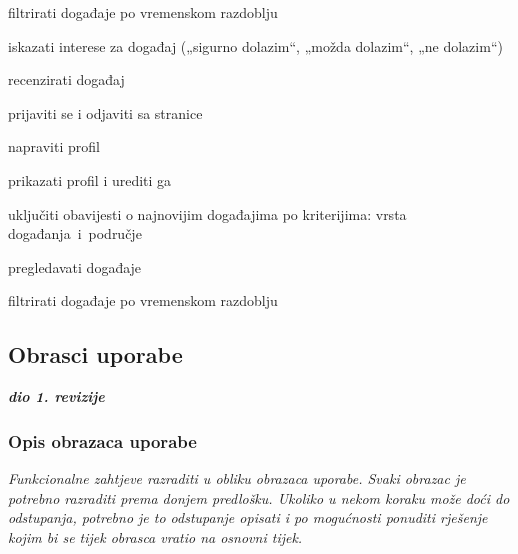 \begin{packed_enum}
\begin{packed_enum}
\begin{packed_enum}
					\item  filtrirati događaje po vremenskom razdoblju
	
					\end{packed_enum}
					
				\end{packed_enum}
					
				\item  {}
					
					\begin{packed_enum}
					\item iskazati interese za događaj („sigurno dolazim“, „možda dolazim“, „ne dolazim“)
					\item recenzirati događaj	
					\item prijaviti se i odjaviti sa stranice
					\item napraviti profil
					\item prikazati profil i urediti ga
					\item uključiti obavijesti o najnovijim događajima po kriterijima: vrsta događanja i područje
					\item pregledavati događaje
					\begin{packed_enum}
	
						\item  filtrirati događaje po vremenskom razdoblju
	
					\end{packed_enum}
															
					\end{packed_enum}
												
			\end{packed_enum}
			
			\eject 
			
			
				
			\subsection{Obrasci uporabe}
				
				\textbf{\textit{dio 1. revizije}}
				
				\subsubsection{Opis obrazaca uporabe}
					\textit{Funkcionalne zahtjeve razraditi u obliku obrazaca uporabe. Svaki obrazac je potrebno razraditi prema donjem predlošku. Ukoliko u nekom koraku može doći do odstupanja, potrebno je to odstupanje opisati i po mogućnosti ponuditi rješenje kojim bi se tijek obrasca vratio na osnovni tijek.}\\
					

